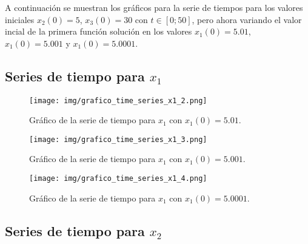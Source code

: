 A continuación se muestran los gráficos para la serie de tiempos para los valores iniciales $x_{2}(0) = 5$, $x_{3}(0) = 30$ con $t \in [0; 50]$, pero ahora variando el valor incial de la primera función solución en los valores $x_{1}(0) = 5.01$, $x_{1}(0) = 5.001$ y $x_{1}(0) = 5.0001$.


\clearpage

\subsection{Series de tiempo para $x_{1}$}


\begin{figure}[!h] %
\begin{center}
\texttt{[image: img/grafico\_time\_series\_x1\_2.png]} %
\caption{\label{fig:fig_ts_x1_iv2}\footnotesize{Gráfico de la serie de tiempo para $x_{1}$ con $x_{1}(0) = 5.01$.}}
\end{center}
\end{figure}


\begin{figure}[!h] %
\begin{center}
\texttt{[image: img/grafico\_time\_series\_x1\_3.png]} %
\caption{\label{fig:fig_ts_x1_iv3}\footnotesize{Gráfico de la serie de tiempo para $x_{1}$ con $x_{1}(0) = 5.001$.}}
\end{center}
\end{figure}


\begin{figure}[!h] %
\begin{center}
\texttt{[image: img/grafico\_time\_series\_x1\_4.png]} %
\caption{\label{fig:fig_ts_x1_iv4}\footnotesize{Gráfico de la serie de tiempo para $x_{1}$ con $x_{1}(0) = 5.0001$.}}
\end{center}
\end{figure}

\clearpage



\subsection{Series de tiempo para $x_{2}$}

